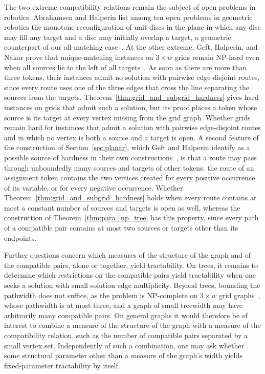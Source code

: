 \documentclass[a4paper,USenglish,thm-restate]{lipics-v2021}
\theoremstyle{problemstyle}
\begin{document}
The two extreme compatibility relations remain the subject of open
problems in robotics. Abrahamsen and Halperin list among ten open
problems in geometric robotics the monotone reconfiguration of unit
discs in the plane in which any disc may fill any target and a disc may
initially overlap a target, a geometric counterpart of our all-matching
case~\cite{AbrahamsenHalperin2024Geobotics}.
At the other extreme, Geft, Halperin, and Nakar prove that unique-matching instances on
$3 \times w$ grids remain \textsf{NP}-hard even when all sources lie
to the left of all targets~\cite{GeftHalperinNakar2024}. As soon as there
are more than three tokens, their instances admit no solution with
pairwise edge-disjoint routes, since every route uses one of the three
edges that cross the line separating the sources from the targets.
Theorem~\ref{thm:grid_and_subgrid_hardness} gives hard instances on grids
that admit such a solution, but its proof places a token whose source is
its target at every vertex missing from the grid graph. Whether grids
remain hard for instances that admit a solution with pairwise
edge-disjoint routes and in which no vertex is both a source and a
target is open. A second feature of the
construction of Section~\ref{sec:planar}, which Geft and Halperin
identify as a possible source of hardness in their own
constructions~\cite{GeftHalperin2022Refined}, is that a route may pass
through unboundedly many sources and targets of other tokens: the route
of an assignment token contains the two vertices created for every
positive occurrence of its variable, or for every negative occurrence.
Whether Theorem~\ref{thm:grid_and_subgrid_hardness} holds when every
route contains at most a constant number of sources and targets is open
as well, whereas the construction of Theorem~\ref{thm:para_np_tree} has
this property, since every path of a compatible pair contains at most
two sources or targets other than its endpoints.
 
Further questions concern which measures of the structure of the graph
and of the compatible pairs, alone or together, yield tractability. On
trees, it remains to determine which restrictions on the compatible pairs
yield tractability when one seeks a solution with small solution edge
multiplicity. Beyond trees, bounding the pathwidth does not suffice, as
the problem is \textsf{NP}-complete on $3 \times w$ grid
graphs~\cite{GeftHalperinNakar2024}, whose
pathwidth is at most three, and a graph of small treewidth may have
arbitrarily many compatible pairs. On general graphs it would therefore be
of interest to combine a measure of the structure of the graph with a
measure of the compatibility relation, such as the number of compatible
pairs separated by a small vertex set. Independently of such a
combination, one may ask whether some structural parameter other than a
measure of the graph's width yields fixed-parameter tractability by
itself.
 
\end{document}
